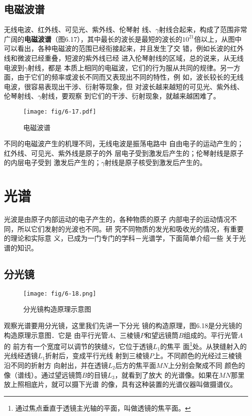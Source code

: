 \subsection{电磁波谱}

无线电波、红外线、可见光、紫外线、伦琴射
线、$\gamma$射线合起来，构成了范围非常广阔的\textbf{电磁波谱}（图6.17），其中最长的波长是最短的波长的$10^{21}$倍以上，从图中
可以看出，各种电磁波的范围已经衔接起来，并且发生了交
错，例如长波的红外线和微波已经重叠，短波的紫外线已经
进入伦琴射线的区域，总的说来，从无线电波到$\gamma$射线，都是
本质上相同的电磁波，它们的行为服从共同的规律。另一方
面，由于它们的频率或波长不同而又表现出不同的特性，例
如，波长较长的无线电波，很容易表现出干涉、衍射等现象，但
对波长越来越短的可见光、紫外线、伦琴射线、$\gamma$射线，要观察
到它们的干涉、衍射现象，就越来越困难了。

\begin{figure}[htp]\centering
    \texttt{[image: fig/6-17.pdf]}
    \caption{电磁波谱}
    \end{figure}

不同的电磁波产生的机理不同，无线电波是振荡电路中
自由电子的运动产生的；红外线、可见光、紫外线是原子的外
层电子受到激发后产生的；伦琴射线是原子的内层电子受到
激发后产生的；$\gamma$射线是原子核受到激发后产生的。

\section{光谱}
光波是由原子内部运动的电子产生的，各种物质的原子
内部电子的运动情况不同，所以它们发射的光波也不同。研
究不同物质的发光和吸收光的情况，有重要的理论和实际意
义，已成为一门专门的学科－光谱学，下面简单介绍一些
关于光谱的知识。

\subsection{分光镜}
\begin{figure}[htp]\centering
    \texttt{[image: fig/6-18.png]}
    \caption{分光镜构造原理示意图}
    \end{figure}

观察光谱要用分光镜，这里我们先讲一下分光
镜的构造原理，图6.18是分光镜的构造原理示意图．它是
由平行光管$A$、三棱镜$P$和望远镜筒$B$组成的。平行光管$A$的
前方有一个宽度可以调节的狭缝$S$，它位于透镜$L_1$的焦平
面\footnote{通过焦点垂直于透镜主光轴的平面，叫做透镜的焦平面。}处。从狭缝射入的光线经透镜$L_1$折射后，变成平行光线
射到三棱镜$P$上。不同颜色的光经过三棱镜沿不同的折射方
向射出，并在透镜$L_2$后方的焦平面$MN$上分别会聚成不同
颜色的像（谱线）。通过望远镜筒$B$的目镜$L_3$，就看到了放大
的光谱像。如果在$MN$那里放上照相底片，就可以摄下光谱
的像，具有这种装置的光谱仪器叫做摄谱仪。

